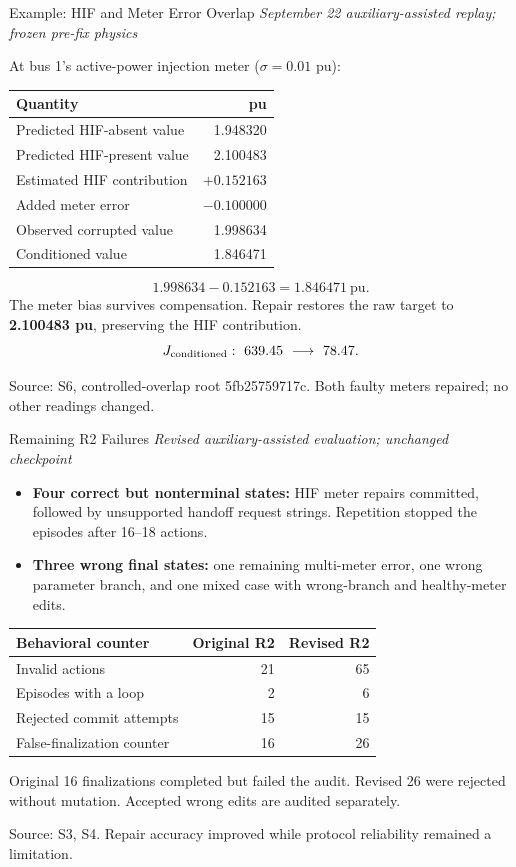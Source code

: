 \documentclass{beamer}
\newcommand{\src}[1]{\par\vfill\begin{minipage}{0.67\textwidth}\tiny\color{gray}Source: #1.\end{minipage}\par}
\newcommand{\scope}[1]{{\small\textit{#1}}\par\vspace{0.5em}}
\begin{document}
\begin{frame}{Example: HIF and Meter Error Overlap}
  \scope{September 22 auxiliary-assisted replay; frozen pre-fix physics}
  \small At bus 1's active-power injection meter ($\sigma=0.01$ pu):
  \begin{center}
    \renewcommand{\arraystretch}{1.2}
    \begin{tabular}{lr}
      \toprule
      Quantity & pu \\
      \midrule
      Predicted HIF-absent value & 1.948320 \\
      Predicted HIF-present value & 2.100483 \\
      Estimated HIF contribution & $+0.152163$ \\
      Added meter error & $-0.100000$ \\
      Observed corrupted value & 1.998634 \\
      Conditioned value & 1.846471 \\
      \bottomrule
    \end{tabular}
  \end{center}
  \[1.998634-0.152163=1.846471\ \mathrm{pu}.\]
  The meter bias survives compensation. Repair restores the raw target to \textbf{2.100483 pu}, preserving the HIF contribution.
  \[J_{\rm conditioned}:\ 639.45\ \longrightarrow\ 78.47.\]
  \src{S6, controlled-overlap root 5fb25759717c. Both faulty meters repaired; no other readings changed}
\end{frame}

\begin{frame}{Remaining R2 Failures}
  \scope{Revised auxiliary-assisted evaluation; unchanged checkpoint}
  \begin{itemize}
    \setlength\itemsep{0.6em}
    \item \textbf{Four correct but nonterminal states:} HIF meter repairs committed, followed by unsupported handoff request strings. Repetition stopped the episodes after 16--18 actions.
    \item \textbf{Three wrong final states:} one remaining multi-meter error, one wrong parameter branch, and one mixed case with wrong-branch and healthy-meter edits.
  \end{itemize}
  \small
  \begin{center}
    \renewcommand{\arraystretch}{1.15}
    \begin{tabular}{lrr}
      \toprule
      Behavioral counter & Original R2 & Revised R2 \\
      \midrule
      Invalid actions & 21 & 65 \\
      Episodes with a loop & 2 & 6 \\
      Rejected commit attempts & 15 & 15 \\
      False-finalization counter & 16 & 26 \\
      \bottomrule
    \end{tabular}
  \end{center}
  Original 16 finalizations completed but failed the audit. Revised 26 were rejected without mutation. Accepted wrong edits are audited separately.
  \src{S3, S4. Repair accuracy improved while protocol reliability remained a limitation}
\end{frame}
\end{document}
